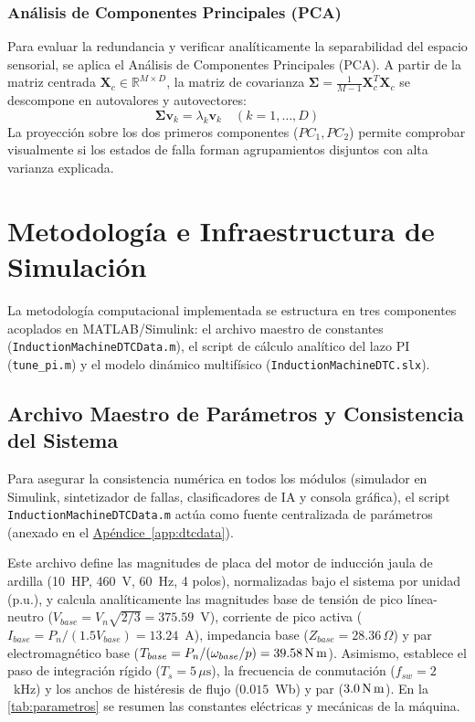 \documentclass[conference]{IEEEtran}
\begin{document}
\subsubsection{Análisis de Componentes Principales (PCA)}
Para evaluar la redundancia y verificar analíticamente la separabilidad del espacio sensorial, se aplica el Análisis de Componentes Principales (PCA). A partir de la matriz centrada $\mathbf{X}_c \in \mathbb{R}^{M \times D}$, la matriz de covarianza $\boldsymbol{\Sigma} = \frac{1}{M-1} \mathbf{X}_c^T \mathbf{X}_c$ se descompone en autovalores y autovectores:
\begin{equation}
    \boldsymbol{\Sigma} \mathbf{v}_k = \lambda_k \mathbf{v}_k \quad (k = 1, \dots, D)
    \label{eq:pca_eigen}
\end{equation}
La proyección sobre los dos primeros componentes ($PC_1, PC_2$) permite comprobar visualmente si los estados de falla forman agrupamientos disjuntos con alta varianza explicada.

\section{Metodología e Infraestructura de Simulación}

La metodología computacional implementada se estructura en tres componentes acoplados en MATLAB/Simulink: el archivo maestro de constantes (\texttt{InductionMachineDTCData.m}), el script de cálculo analítico del lazo PI (\texttt{tune\_pi.m}) y el modelo dinámico multifísico (\texttt{InductionMachineDTC.slx}).

\subsection{Archivo Maestro de Parámetros y Consistencia del Sistema}
Para asegurar la consistencia numérica en todos los módulos (simulador en Simulink, sintetizador de fallas, clasificadores de IA y consola gráfica), el script \texttt{InductionMachineDTCData.m} actúa como fuente centralizada de parámetros (anexado en el \hyperref[app:dtcdata]{Apéndice~\ref*{app:dtcdata}}).

Este archivo define las magnitudes de placa del motor de inducción jaula de ardilla (10~HP, 460~V, 60~Hz, 4 polos), normalizadas bajo el sistema por unidad (p.u.), y calcula analíticamente las magnitudes base de tensión de pico línea-neutro ($V_{base} = V_n \sqrt{2/3} = 375.59$~V), corriente de pico activa ($I_{base} = P_n / (1.5 V_{base}) = 13.24$~A), impedancia base ($Z_{base} = 28.36\,\Omega$) y par electromagnético base ($T_{base} = P_n / (\omega_{base}/p) = 39.58\,\text{N\,m}$). Asimismo, establece el paso de integración rígido ($T_s = 5\,\mu\text{s}$), la frecuencia de conmutación ($f_{sw} = 2$~kHz) y los anchos de histéresis de flujo ($0.015$~Wb) y par ($3.0\,\text{N\,m}$). En la \autoref{tab:parametros} se resumen las constantes eléctricas y mecánicas de la máquina.
\end{document}
